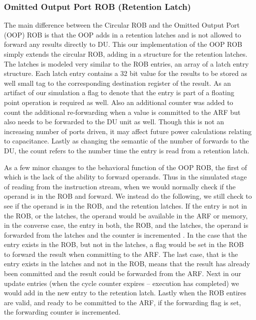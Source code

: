\subsubsection{Omitted Output Port ROB (Retention Latch)}
The main difference between the Circular ROB and the Omitted Output Port (OOP) ROB is that the OOP adds in a retention latches and is not allowed to forward any results directly to DU.  
This our implementation of the OOP ROB simply extends the circular ROB, adding in a structure for the retention latches.  The latches is modeled very similar to the ROB entries, an array
of a latch entry structure.  Each latch entry contains a 32 bit value for the results to be stored as well small tag to the corresponding destination register of the result.  As an artifact of our 
simulation a flag to denote that the entry is part of a floating point operation is required as well.  Also an additional counter was added to count the additional re-forwarding when a value
is committed to the ARF but also needs to be forwarded to the DU unit as well.  Though this is not an increasing number of ports driven, it may affect future power calculations relating to 
capacitance.  Lastly as changing the semantic of the number of forwards to the DU, the count refers to the number time the entry is read from a retention latch.

As a few minor changes to the behavioral function of the OOP ROB, the first of which is the lack of the ability to forward operands.  Thus in the simulated stage of reading from the instruction
stream, when we would normally check if the operand is in the ROB and forward.  We instead do the following, we still check to see if the operand is in the ROB, and the retention latches. 
If the entry is not in the ROB, or the latches, the operand would be available in the ARF or memory, in the converse case,  the entry in both, the ROB, and the latches, the operand is forwarded
from the latches and the counter is incremented .  In the case that the entry exists in the ROB, but not in the latches, a flag would be set in the ROB to forward the result when committing to the ARF. 
The last case, that is the entry exists in the latches and not in the ROB, means that the result has already been committed and the result could be forwarded from the ARF.  Next in our update entries 
(when the cycle counter expires -- execution has completed) we would add in the new entry to the retention latch.  Lastly when the ROB entires are valid, and ready to be committed to the ARF,
if the forwarding flag is set, the forwarding counter is incremented.
